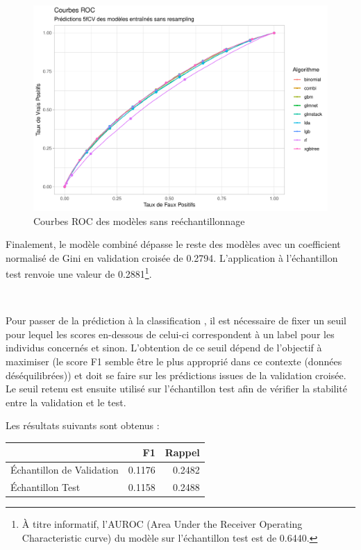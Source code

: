 \documentclass[french]{article}
\begin{document}
\begin{multicols}{2}
\begin{figure}[H] \centering
  \includegraphics[width = \columnwidth]{img/roc_curves}
  \caption{Courbes ROC des modèles sans reéchantillonnage}
\end{figure}

Finalement, le modèle combiné dépasse le reste des modèles avec un coefficient normalisé de Gini en validation croisée de 0.2794. L'application à l'échantillon test renvoie une valeur de 0.2881\footnote{À titre informatif, l'AUROC (Area Under the Receiver Operating Characteristic curve) du modèle sur l'échantillon test est de 0.6440.}.

\

Pour passer de la prédiction à la classification \cite{fhar}, il est nécessaire de fixer un seuil pour lequel les scores en-dessous de celui-ci correspondent à un label   \fg{} pour les individus concernés et  \fg{} sinon. L'obtention de ce seuil dépend de l'objectif à maximiser (le score F1 semble être le plus approprié dans ce contexte (données déséquilibrées)) et doit se faire sur les prédictions issues de la validation croisée. Le seuil retenu est ensuite utilisé sur l'échantillon test afin de vérifier la stabilité entre la validation et le test.
\columnbreak

Les résultats suivants sont obtenus :

\begin{center}\begin{tabular}{|l|r|r|} \hline
  & F1 & Rappel \\ \hline
  Échantillon de Validation & 0.1176 & 0.2482 \\
  Échantillon Test & 0.1158 & 0.2488 \\ \hline
\end{tabular}\end{center}


\end{multicols}
\end{document}
